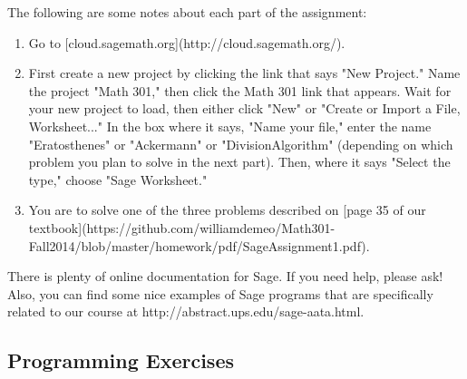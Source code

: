 \documentclass[12pt,reqno]{amsart}
\begin{document}
The following are some notes about each part of the assignment:

\begin{enumerate}
\item 
Go to [cloud.sagemath.org](http://cloud.sagemath.org/).

\item First create a new project by clicking the link that says "New
   Project."  Name the project "Math 301," then click the Math 301 link that
   appears.  Wait for your new project to load, then either click "New" or
   "Create or Import a File, Worksheet..." In the box where it says, "Name
   your file," enter the name "Eratosthenes" or "Ackermann" or
   "DivisionAlgorithm" (depending on which problem you plan to solve in the next
   part). Then, where it says "Select the type," choose "Sage Worksheet."

\item You are to solve one of the three problems described on
   [page 35 of our textbook](https://github.com/williamdemeo/Math301-Fall2014/blob/master/homework/pdf/SageAssignment1.pdf).
\end{enumerate}

There is plenty of online documentation for Sage. If you need help, please ask!
Also, you can find some nice examples of Sage programs that are specifically
related to our course at http://abstract.ups.edu/sage-aata.html. 

\subsection*{Programming Exercises}
\end{document}
